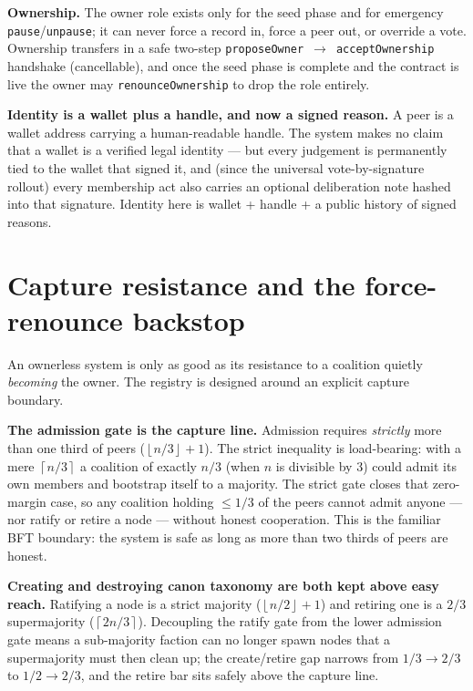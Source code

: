 \documentclass[11pt,a4paper]{article}
\newcommand{\arr}{\ensuremath{\rightarrow}}
\newcommand{\ceilop}[1]{\ensuremath{\left\lceil #1 \right\rceil}}
\newcommand{\floorop}[1]{\ensuremath{\left\lfloor #1 \right\rfloor}}
\begin{document}
\textbf{Ownership.} The owner role exists only for the seed phase and
for emergency \texttt{pause}/\texttt{unpause}; it can never force a
record in, force a peer out, or override a vote. Ownership transfers in
a safe two-step \texttt{proposeOwner}~\arr~\texttt{acceptOwnership}
handshake (cancellable), and once the seed phase is complete and the
contract is live the owner may \texttt{renounceOwnership} to drop the
role entirely.

\begin{notebox}
\textbf{Identity is a wallet plus a handle, and now a signed reason.}
A peer is a wallet address carrying a human-readable handle. The system
makes no claim that a wallet is a verified legal identity --- but every
judgement is permanently tied to the wallet that signed it, and (since
the universal vote-by-signature rollout) every membership act also
carries an optional deliberation note hashed into that signature.
Identity here is wallet + handle + a public history of signed reasons.
\end{notebox}

\section{Capture resistance and the force-renounce backstop}

An ownerless system is only as good as its resistance to a coalition quietly
\emph{becoming} the owner. The registry is designed around an explicit
capture boundary.

\textbf{The admission gate is the capture line.} Admission requires
\emph{strictly} more than one third of peers ($\floorop{n/3}+1$). The strict
inequality is load-bearing: with a mere $\ceilop{n/3}$ a coalition of exactly
$n/3$ (when $n$ is divisible by 3) could admit its own members and bootstrap
itself to a majority. The strict gate closes that zero-margin case, so any
coalition holding $\leq 1/3$ of the peers cannot admit anyone --- nor ratify
or retire a node --- without honest cooperation. This is the familiar BFT
boundary: the system is safe as long as more than two thirds of peers are
honest.

\textbf{Creating and destroying canon taxonomy are both kept above easy
reach.} Ratifying a node is a strict majority ($\floorop{n/2}+1$) and
retiring one is a $2/3$ supermajority ($\ceilop{2n/3}$). Decoupling the
ratify gate from the lower admission gate means a sub-majority faction can no
longer spawn nodes that a supermajority must then clean up; the
create/retire gap narrows from $1/3 \to 2/3$ to $1/2 \to 2/3$, and the retire
bar sits safely above the capture line.
\end{document}
